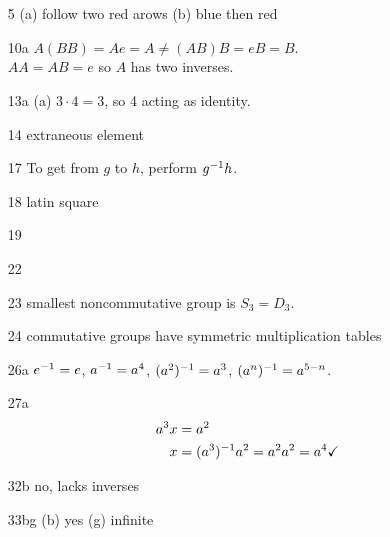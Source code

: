 \documentclass[12pt]{article}
\begin{document}
\section{}
\begin{enumerate}
\item[5] (a) follow two red arows (b) blue then red \checkmark
\item[10a] $A(BB) = Ae = A \neq (AB)B = eB = B$.\\
  $AA = AB = e$ so $A$ has two inverses.
\item[13a] (a)
  $3\cdot 4 = 3$, so 4 acting as identity. 
\item[14] extraneous element \checkmark
\item[17] To get from $g$ to $h$, perform $g^{-1}h$.
\item[18] latin square
\item[19]
\item[22]
\item[23] smallest noncommutative group is $S_3 = D_3$. \checkmark
\item[24] commutative groups have symmetric multiplication tables
\item[26a] $e^{-1} = e$, $a^{-1} = a^4$, $(a^2)^{-1} = a^3$, $(a^n)^{-1} = a^{5 - n}$. \checkmark
\item[27a]
  \begin{align*}
    a^3x &= a^2\\
       x  &= (a^3)^{-1}a^2 = a^2a^2 = a^4 \checkmark
  \end{align*}
\item[32b] no, lacks inverses \checkmark
\item[33bg] (b) yes  (g) infinite
\end{enumerate}
\end{document}
